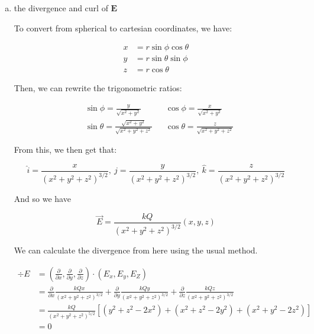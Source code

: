 \documentclass[10pt]{article}
\begin{document}
    \begin{enumerate}[(a)]
        \item the divergence and curl of $\mathit{\mathbf E}$

        \begin{solution}
            To convert from spherical to cartesian coordinates, we have:

            \begin{align*}
                x &= r \sin \phi \cos \theta\\
                y &= r \sin \theta \sin \phi\\
                z &= r \cos \theta
            \end{align*}

            Then, we can rewrite the trigonometric ratios: 

            \begin{align*}
                & \sin \phi = \frac{y}{\sqrt{x^2 + y^2}} && \cos \phi = \frac{x}{\sqrt{x^2 + y^2}}\\
                & \sin \theta = \frac{\sqrt{x^2 + y^2}}{\sqrt{x^2 + y^2 + z^2}} && \cos \theta = \frac{z}{\sqrt{x^2 + y^2 + z^2}}
            \end{align*}

            From this, we then get that: 

            \[ \hat i = \frac{x}{(x^2 + y^2 + z^2)^{3/2}}, \  \hat j = \frac{y}{(x^2 + y^2 + z^2)^{3/2}},  \ \hat k = \frac{z}{(x^2 + y^2 + z^2)^{3/2}}\]

            And so we have 

            \[ \vec E = \frac{kQ}{(x^2 + y^2 + z^2)^{3/2}}(x, y, z)\]

            We can calculate the divergence from here using the usual method. 
            
            \begin{align*}
                \div E &= \left( \frac{\partial}{\partial x}, \frac{\partial}{\partial y}, \frac{\partial}{\partial z}\right) \cdot \left( E_x, E_y, E_Z\right)\\
                &= \frac{\partial}{\partial x} \frac{kQx}{(x^2 + y^2 + z^2)^{3/2}} + \frac{\partial}{\partial y} \frac{kQy}{(x^2 + y^2 + z^2)^{3/2}} + \frac{\partial}{\partial z}\frac{kQz}{(x^2 + y^2 + z^2)^{3/2}}\\
                &= \frac{kQ}{(x^2 + y^2 + z^2)^{5/2}}\left[ (y^2 + z^2 - 2x^2) + (x^2 + z^2 - 2y^2) + (x^2 + y^2 -2z^2) \right]\\
                &= 0
            \end{align*}


\end{solution}
\end{enumerate}
\end{document}
